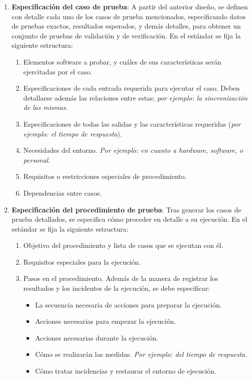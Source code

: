 \begin{enumerate}
    \item \textbf{Especificación del caso de prueba}: A partir del anterior diseño, se definen con detalle cada uno de los casos de prueba mencionados, especificando datos de pruebas exactos, resultados esperados, y demás detalles, para obtener un conjunto de pruebas de validación y de verificación. En el estándar se fija la siguiente estructura:
    \begin{enumerate}
        \item Elementos software a probar, y cuáles de sus características serán ejercitadas por el caso.
        \item Especificaciones de cada entrada requerida para ejecutar el caso. Deben detallarse además las relaciones entre estas; \textit{por ejemplo: la sincronización de las mismas.}
        \item Especificaciones de todas las salidas y las características requeridas (\textit{por ejemplo: el tiempo de respuesta}).
        \item Necesidades del entorno. \textit{Por ejemplo: en cuanto a hardware, software, o personal}.
        \item Requisitos o restricciones especiales de procedimiento.
        \item Dependencias entre casos.
    \end{enumerate}

    \item \textbf{Especificación del procedimiento de prueba}: Tras generar los casos de prueba detallados, se especifica cómo proceder en detalle a su ejecución. En el estándar se fija la siguiente estructura:
    \begin{enumerate}
        \item Objetivo del procedimiento y lista de casos que se ejecutan con él.
        \item Requisitos especiales para la ejecución.
        \item Pasos en el procedimiento. Además de la manera de registrar los resultados y los incidentes de la ejecución, se debe especificar:
        \begin{itemize}
            \item La secuencia necesaria de acciones para preparar la ejecución.
            \item Acciones necesarias para empezar la ejecución.
            \item Acciones necesarias durante la ejecución.
            \item Cómo se realizarán las medidas. \textit{Por ejemplo: del tiempo de respuesta.}
            \item Cómo tratar incidencias y restaurar el entorno de ejecución.
        \end{itemize}
    \end{enumerate}
\end{enumerate}


